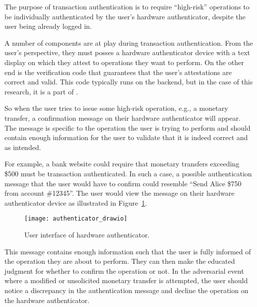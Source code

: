 The purpose of transaction authentication is to require ``high-risk'' operations to be individually authenticated by the user's hardware authenticator, despite the user being already logged in. 

A number of components are at play during transaction authentication. From the user's perspective, they must posses a hardware authenticator device with a text display on which they attest to operations they want to perform. On the other end is the verification code that guarantees that the user's attestations are correct and valid. This code typically runs on the backend, but in the case of this research, it is a part of \sys{}.

So when the user tries to issue some high-risk operation, e.g., a monetary transfer, a confirmation message on their hardware authenticator will appear. The message is specific to the operation the user is trying to perform and should contain enough information for the user to validate that it is indeed correct and as intended. 

For example, a bank website could require that monetary transfers exceeding \$500 must be transaction authenticated. In such a case, a possible authentication message that the user would have to confirm could resemble ``Send Alice \$750 from account \#12345''. The user would view the message on their hardware authenticator device as illustrated in Figure~\ref{Fig:HardwareAuthenticatorView}.

\begin{figure}[h]
  \centering
  \texttt{[image: authenticator\_drawio]}
  \caption{User interface of hardware authenticator.}
  \label{Fig:HardwareAuthenticatorView}
\end{figure}




This message contains enough information such that the user is fully informed of the operation they are about to perform. They can then make the educated judgment for whether to confirm the operation or not. In the adversarial event where a modified or unsolicited monetary transfer is attempted, the user should notice a discrepancy in the authentication message and decline the operation on the hardware authenticator. 

